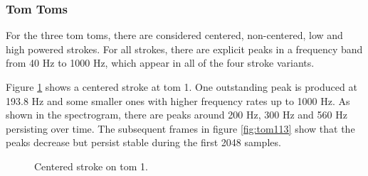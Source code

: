 \subsubsection{Tom Toms}

For the three tom toms, there are considered centered, non-centered, low and high powered strokes. For all strokes, there are explicit peaks in a frequency band from 40 Hz to 1000 Hz, which appear in all of the four stroke variants.
 
Figure \ref{fig:tom11} shows a centered stroke at tom 1. One outstanding peak is produced at 193.8 Hz and some smaller ones with higher frequency rates up to 1000 Hz. As shown in the spectrogram, there are peaks around 200 Hz, 300 Hz and 560 Hz persisting over time. The subsequent frames in figure \ref{fig:tom113} show that the peaks decrease but persist stable during the first 2048 samples. 

\begin{figure}
	\centering
	\caption{Centered stroke on tom 1.}
	\label{fig:tom11}
\end{figure}

